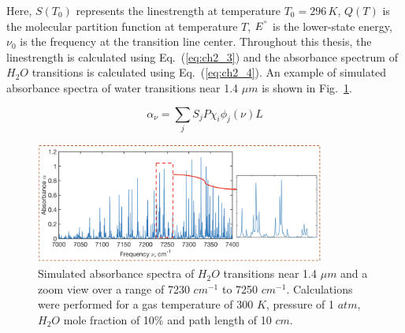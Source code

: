 \vspace{4mm}

\noindent Here, $S(T_0)$ represents the linestrength at temperature $T_0 = 296 \,K$, $Q(T)$ is the molecular partition function at temperature $T$, $E^"$ is the lower-state energy, $\nu_0$ is the frequency at the transition line center. Throughout this thesis, the linestrength is calculated using Eq.\ (\ref{eq:ch2_3}) and the absorbance spectrum of $H_2O$ transitions is calculated using Eq.\ (\ref{eq:ch2_4}). An example of simulated absorbance spectra of water transitions near 1.4 $\mu m$ is shown in Fig.\ \ref{fig:ch2_2}.

\begin{equation}\label{eq:ch2_4}
\alpha_\nu=\sum_jS_jP\chi_i\phi_j(\nu)L
\end{equation}

\begin{figure}[ht]
    \centering
        \includegraphics[width=0.85\textwidth]{fig/ch2_fig3.png}
        \caption{Simulated absorbance spectra of $H_2O$ transitions near 1.4 $\mu m$ and a zoom view over a range of 7230 $cm^{-1}$ to 7250 $cm^{-1}$. Calculations were performed for a gas temperature of 300 $K$, pressure of 1 $atm$, $H_2O$ mole fraction of 10$\%$ and path length of 10 $cm$.}
    \label{fig:ch2_2}
\end{figure}

\vspace{50mm}


